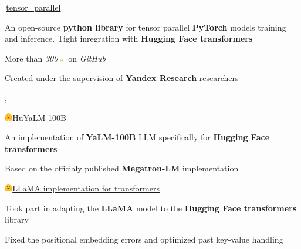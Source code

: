 
\begin{cventries}
  \cventry
    {} %
    {\,\faGithub\acvHeaderIconSep\href{https://github.com/BlackSamorez/tensor_parallel}{tensor\_parallel}} %
    {} %
    {} %
    {
      \begin{cvitems} %
        \item { An open-source \textbf{python library} for tensor parallel \textbf{PyTorch} models training and inference. Tight inregration with \textbf{Hugging Face transformers} }
        \item { More than \textit{300}\includegraphics[width=3.5mm]{image.png} on \textit{GitHub} }
        \item { Created under the supervision of \textbf{Yandex Research} researchers }
      \end{cvitems}
    },

  \cventry
    {} %
    {\includegraphics[width=3.5mm]{hf.jpg}\acvHeaderIconSep\href{https://huggingface.co/BlackSamorez/HuYaLM-100B-fp16}{HuYaLM-100B}} %
    {} %
    {} %
    {
      \begin{cvitems} %
        \item { An implementation of \textbf{YaLM-100B} LLM specifically for \textbf{Hugging Face transformers} }
        \item { Based on the officialy published \textbf{Megatron-LM} implementation }
      \end{cvitems}
    }

  \cventry
    {} %
    {\includegraphics[width=3.5mm]{hf.jpg}\acvHeaderIconSep\href{https://huggingface.co/docs/transformers/main/model_doc/llama}{LLaMA implementation for transformers}} %
    {} %
    {} %
    {
      \begin{cvitems} %
        \item {Took part in adapting the \textbf{LLaMA} model to the \textbf{Hugging Face transformers} library}
        \item {Fixed the positional embedding errors and optimized past key-value handling}
      \end{cvitems}
    }
    

\end{cventries}
